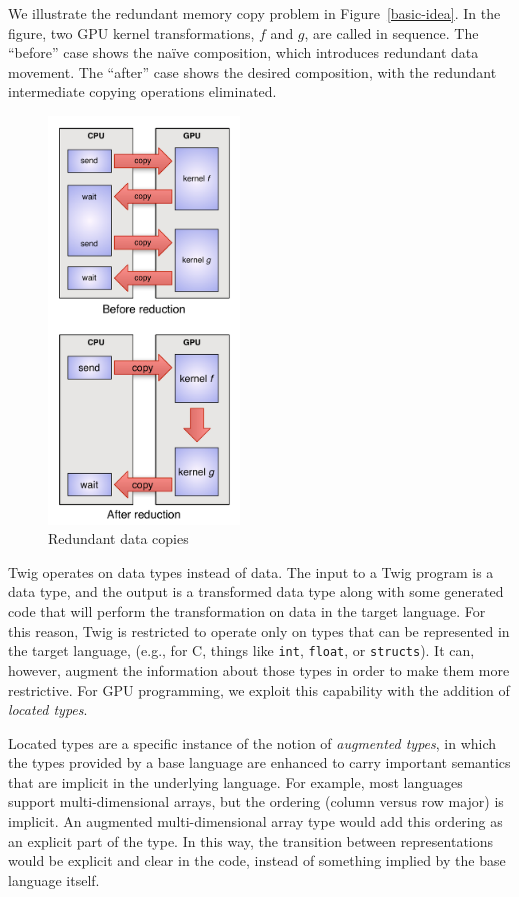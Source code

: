 We illustrate the redundant memory copy problem in Figure~\ref{basic-idea}. In the figure, two GPU kernel transformations, $f$ and $g$, are called in sequence. The ``before'' case shows the na\"ive composition, which introduces redundant data movement. The ``after'' case shows the desired composition, with the redundant intermediate copying operations eliminated.

\begin{figure}[ht]
\begin{center}
\includegraphics[width=2in]{images/basic-idea}
\end{center}
\caption{Redundant data copies}
\label{basic-idea-1}
\end{figure}

Twig operates on data types instead of data. The input to a Twig program is a data type, and the output is a transformed data type along with some generated code that will perform the transformation on data in the target language. For this reason, Twig is restricted to operate only on types that can be represented in the target language, (e.g., for C, things like \texttt{int}, \texttt{float}, or \texttt{structs}). It can, however, augment the information about those types in order to make them more restrictive. For GPU programming, we exploit this capability with the addition of \emph{located types}.

Located types are a specific instance of the notion of \emph{augmented types}, in which the types provided by a base language are enhanced to carry important semantics that are implicit in the underlying language. For example, most languages support multi-dimensional arrays, but the ordering (column versus row major) is implicit. An augmented multi-dimensional array type would add this ordering as an explicit part of the type. In this way, the transition between representations would be explicit and clear in the code, instead of something implied by the base language itself.

